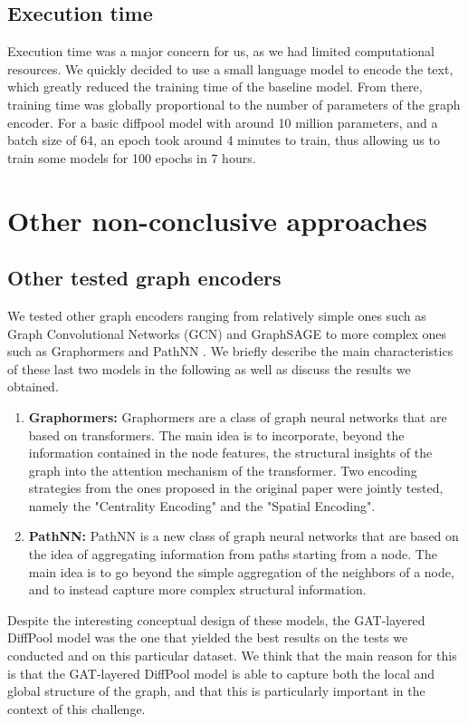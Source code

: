 \documentclass[switch, 11pt]{article}
\begin{document}
\begin{multicols}{2}
    \subsection{Execution time}

    Execution time was a major concern for us, as we had limited computational resources. We quickly decided to use a small language model to encode the text, which greatly reduced the training time of the baseline model. From there, training time was globally proportional to the number of parameters of the graph encoder. For a basic diffpool model with around 10 million parameters, and a batch size of 64, an epoch took around 4 minutes to train, thus allowing us to train some models for 100 epochs in 7 hours.

    \section{Other non-conclusive approaches}
    \label{sec:non-conclusive}
    \subsection{Other tested graph encoders}
    We tested other graph encoders ranging from relatively simple ones such as Graph Convolutional Networks (GCN) \cite{gcn}  and GraphSAGE \cite{graphsage} to more complex ones such as Graphormers \cite{graphormers} and PathNN \cite{pathnn}. We briefly describe the main characteristics of these last two models in the following as well as discuss the results we obtained.
    \begin{enumerate}
        \item \textbf{Graphormers: } Graphormers are a class of graph neural networks that are based on transformers. The main idea is to incorporate, beyond the information contained in the node features,  the structural insights of the graph into the attention mechanism of the transformer. Two encoding strategies from the ones proposed in the original paper \cite{graphormers} were jointly tested, namely the "Centrality Encoding" and the "Spatial Encoding".
        \item \textbf{PathNN: } PathNN \cite{pathnn} is a new class of graph neural networks that are based on the idea of aggregating information from paths starting from a node. The main idea is to go beyond the simple aggregation of the neighbors of a node, and to instead capture more complex structural information.
    \end{enumerate}
    Despite the interesting conceptual design of these models, the GAT-layered DiffPool model was the one that yielded the best results on the tests we conducted and on this particular dataset. We think that the main reason for this is that the GAT-layered DiffPool model is able to capture both the local and global structure of the graph, and that this is particularly important in the context of this challenge.

\end{multicols}
\end{document}
